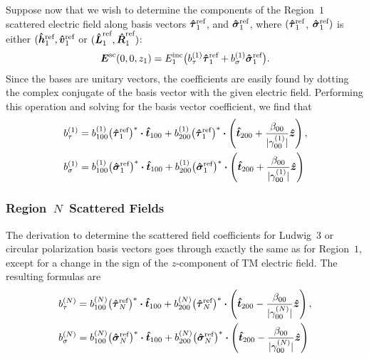 Suppose now that we wish to determine the components of the Region~$1$
scattered electric field along basis vectors $\tauhat_1\refl$, and $\sigmahat_1\refl$, where
$(\tauhat_1\refl$, $\sigmahat_1\refl)$ is either $(\hhat\refl_1, \vhat\refl_1$ or $(\boldsymbol{\hat{L}}^{\text{ref}}_1, \boldsymbol{\hat{R}}^{\text{ref}}_1)$:
\begin{equation}
  \E\scat(0,0,z_1) =  E\inc_1 \bigl(  b\one_{\tau} \tauhat_1\refl + b\one_{\sigma} \sigmahat_1\refl \bigr).
\end{equation}
Since the bases are unitary vectors, the coefficients are easily found by dotting the complex
conjugate of the basis vector with the given electric field.  Performing this operation and solving for
the basis vector coefficient, we find that
\begin{subequations}
\begin{align}
  b_{\tau}\one &= b_{100}\one \bigl(\tauhat_1\refl\bigr)^*  \bdot \t_{100} +
                 b_{200}\one \bigl(\tauhat_1\refl\bigr)^*  \bdot \left( \t_{200} +
                 \frac{\beta_{00}}{\abs{\gamma_{00}\one}} \z \right),   \\
  b_{\sigma}\one &= b_{100}\one \bigl(\sigmahat_1\refl\bigr)^*  \bdot \t_{100} +
                 b_{200}\one \bigl(\sigmahat_1\refl\bigr)^*  \bdot \left( \t_{200} +
                 \frac{\beta_{00}}{\abs{\gamma_{00}\one}} \z \right) 
\end{align}
\end{subequations}


\subsubsection[Region~\textit{N}~Scattered Fields]{Region~\boldmath$N$\unboldmath~Scattered Fields}

The derivation to determine the scattered field coefficients for Ludwig~3 or circular polarization basis
vectors goes through exactly the same as for Region~$1$, except for a change in the sign of the $z$-component
of TM electric field.  The resulting formulas are
\begin{subequations}
\begin{align}
  b_{\tau}\enn &= b_{100}\enn \bigl(\tauhat_N\refl\bigr)^*  \bdot \t_{100} +
                 b_{200}\enn \bigl(\tauhat_N\refl\bigr)^*  \bdot \left( \t_{200} -
                 \frac{\beta_{00}}{\abs{\gamma_{00}\enn}} \z \right),   \\
  b_{\sigma}\enn &= b_{100}\enn \bigl(\sigmahat_N\refl\bigr)^*  \bdot \t_{100} +
                 b_{200}\enn \bigl(\sigmahat_N\refl\bigr)^*  \bdot \left( \t_{200} -
                 \frac{\beta_{00}}{\abs{\gamma_{00}\enn}} \z \right) 
\end{align}
\end{subequations}







